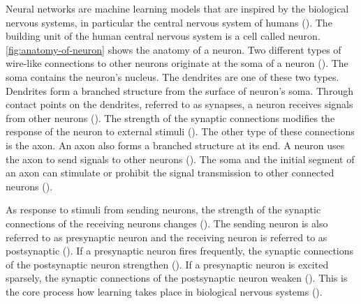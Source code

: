 \documentclass{BachelorBUI}
\begin{document}
            Neural networks are machine learning models that are inspired by the biological nervous systems, in particular the central nervous system of humans (\cite{Aggarwal:2018}). The building unit of the human central nervous system is a cell called neuron. \autoref{fig:anatomy-of-neuron} shows the anatomy of a neuron. Two different types of wire-like connections to other neurons originate at the soma of a neuron (\cite{Gerstner:2014}). The soma contains the neuron's nucleus. The dendrites are one of these two types. Dendrites form a branched structure from the surface of neuron's soma. Through contact points on the dendrites, referred to as synapses, a neuron receives signals from other neurons (\cite{Gerstner:2014}). The strength of the synaptic connections modifies the response of the neuron to external stimuli (\cite{Aggarwal:2018}). The other type of these connections is the axon. An axon also forms a branched structure at its end. A neuron uses the axon to send signals to other neurons (\cite{Gerstner:2014}). The soma and the initial segment of an axon can stimulate or prohibit the signal transmission to other connected neurons (\cite{Gerstner:2014}).

            As response to stimuli from sending neurons, the strength of the synaptic connections of the receiving neurons changes (\cite{Aggarwal:2018}). The sending neuron is also referred to as presynaptic neuron and the receiving neuron is referred to as postsynaptic (\cite{Gerstner:2014}). If a presynaptic neuron fires frequently, the synaptic connections of the postsynaptic neuron strengthen (\cite{Aggarwal:2018}). If a presynaptic neuron is excited sparsely, the synaptic connections of the postsynaptic neuron weaken (\cite{Aggarwal:2018}). This is the core process how learning takes place in biological nervous systems (\cite{Aggarwal:2018}).
\end{document}
